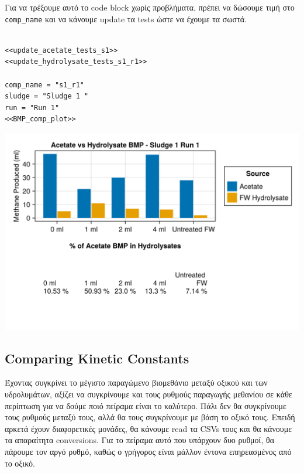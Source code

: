 \documentclass[11pt]{article}
\begin{document}
Για να τρέξουμε αυτό το code block χωρίς προβλήματα, πρέπει να δώσουμε τιμή στο \texttt{comp\_name} και να κάνουμε update τα tests ώστε να έχουμε τα σωστά.
\begin{verbatim}

<<update_acetate_tests_s1>>
<<update_hydrolysate_tests_s1_r1>>

comp_name = "s1_r1"
sludge = "Sludge 1 "
run = "Run 1"
<<BMP_comp_plot>>
\end{verbatim}

\begin{center}
\includegraphics[width=.9\linewidth]{../plots/BMPs/Hydrolyzed FW/acet_vs_hydro_bmp_s1_r1.png}
\end{center}

\subsection{Comparing Kinetic Constants}
\label{sec:orgac6b878}
Έχοντας συγκρίνει το μέγιστο παραγώμενο βιομεθάνιο μεταξύ οξικού και των υδρολυμάτων, αξίζει να συγκρίνουμε και τους ρυθμούς παραγωγής μεθανίου σε κάθε περίπτωση για να δούμε ποιό πείραμα είναι το καλύτερο. Πάλι δεν θα συγκρίνουμε τους ρυθμούς μεταξύ τους, αλλά θα τους συγκρίνουμε με βάση το οξικό τους. Επειδή αρκετά έχουν διαφορετικές μονάδες, θα κάνουμε read τα CSVs τους και θα κάνουμε τα απαραίτητα conversions. Για το πείραμα αυτό που υπάρχουν δυο ρυθμοί, θα πάρουμε τον αργό ρυθμό, καθώς ο γρήγορος είναι μάλλον έντονα επηρεασμένος από το οξικό. 
\end{document}
